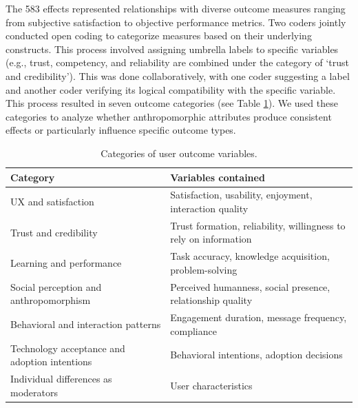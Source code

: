 \documentclass[sigconf,review,anonymous]{acmart}
\begin{document}
The 583 effects represented relationships with diverse outcome measures ranging from subjective satisfaction to objective performance metrics. Two coders jointly conducted open coding to categorize measures based on their underlying constructs. This process involved assigning umbrella labels to specific variables (e.g., trust, competency, and reliability are combined under the category of `trust and credibility'). This was done collaboratively, with one coder suggesting a label and another coder verifying its logical compatibility with the specific variable. %
This process resulted in seven outcome categories (see Table \ref{tab:categories}). We used these categories to analyze whether anthropomorphic attributes produce consistent effects or particularly influence specific outcome types. %

\begin{table}[h]
\caption{Categories of user outcome variables.}
\label{tab:categories}
\footnotesize
\begin{tabular}{@{}p{}p{}@{}}
\toprule
\textbf{Category} & \textbf{Variables contained} \\
\midrule
UX and satisfaction & Satisfaction, usability, enjoyment, interaction quality \\
\addlinespace
Trust and credibility & Trust formation, reliability, willingness to rely on information \\
\addlinespace
Learning and performance & Task accuracy, knowledge acquisition, problem-solving \\
\addlinespace
Social perception and anthropomorphism & Perceived humanness, social presence, relationship quality \\
\addlinespace
Behavioral and interaction patterns & Engagement duration, message frequency, compliance \\
\addlinespace
Technology acceptance and adoption intentions & Behavioral intentions, adoption decisions \\
\addlinespace
Individual differences as moderators & User characteristics \\
\bottomrule
\end{tabular}
\end{table}
\end{document}
